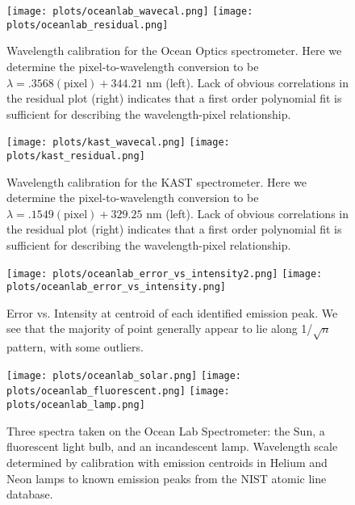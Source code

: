 \documentclass[preprint]{aastex62}
\begin{document}
\begin{figure}[H]
\begin{center}
\texttt{[image: plots/oceanlab\_wavecal.png]}
\texttt{[image: plots/oceanlab\_residual.png]}
\caption{Wavelength calibration for the Ocean Optics spectrometer. Here we determine the pixel-to-wavelength conversion to be $\lambda=.3568(\mathrm{pixel})+344.21$ nm (left). Lack of obvious correlations in the residual plot (right) indicates that a first order polynomial fit is sufficient for describing the wavelength-pixel relationship.} \label{fig:oceanlab_wavecal}
\end{center}
\end{figure}

\begin{figure}[H]
\begin{center}
\texttt{[image: plots/kast\_wavecal.png]}
\texttt{[image: plots/kast\_residual.png]}
\caption{Wavelength calibration for the KAST spectrometer. Here we determine the pixel-to-wavelength conversion to be $\lambda=.1549(\mathrm{pixel})+329.25$ nm (left). Lack of obvious correlations in the residual plot (right) indicates that a first order polynomial fit is sufficient for describing the wavelength-pixel relationship.} \label{fig:kast_wavecal}
\end{center}
\end{figure}

\begin{figure}[H]
\begin{center}
\texttt{[image: plots/oceanlab\_error\_vs\_intensity2.png]}
\texttt{[image: plots/oceanlab\_error\_vs\_intensity.png]}
\caption{Error vs. Intensity at centroid of each identified emission peak. We see that the majority of point generally appear to lie along 1/$\sqrt{n}$ pattern, with some outliers.} \label{fig:error_vs_intensity}
\end{center}
\end{figure}

\begin{figure}[H]
\begin{center}
\texttt{[image: plots/oceanlab\_solar.png]}
\texttt{[image: plots/oceanlab\_fluorescent.png]}
\texttt{[image: plots/oceanlab\_lamp.png]}
\caption{Three spectra taken on the Ocean Lab Spectrometer: the Sun, a fluorescent light bulb, and an incandescent lamp. Wavelength scale determined by calibration with emission centroids in Helium and Neon lamps to known emission peaks from the NIST atomic line database.} \label{fig:oceanlab_specs}
\end{center}
\end{figure}
\end{document}
